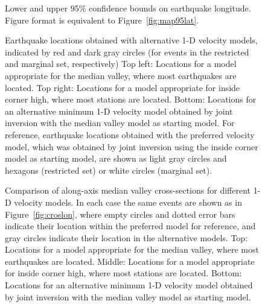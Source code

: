 \documentclass[jgrga]{agu2001} %
\renewcommand{\includefig}[2]{}
\newlength{\tw}
\begin{document}
\begin{figure}

\includefig{seismag-map-95/seismag-map-95-2}{0.65\tw} %

\includefig{seismag-map-95/seismag-map-95-3}{0.65\tw} %

\caption{Lower and upper 95\% confidence bounds on earthquake
longitude.  Figure format is equivalent to Figure~\ref{fig:map95lat}. }
\label{fig:map95lon}
\end{figure}

\begin{figure}

\setlength{\figarrwidth}{0.5\tw}

\includefig{seismag-map-var/seismag-map-jhd-mva-obh10}{20pc} \includefig{seismag-map-var/seismag-map-jhd-pro109kmvel}{20pc} %

\includefig{seismag-map-var/seismag-map-inv-mva-obh10}{20pc} %

\caption{Earthquake locations obtained with alternative 1-D velocity
models, indicated by  red and dark gray circles (for events in the
restricted and marginal set, respectively)
Top left: Locations for a model appropriate for the median valley, where most
earthquakes are located. 
Top right: Locations for a model appropriate for inside corner high, where most
stations are located. 
Bottom: Locations for an alternative minimum 1-D velocity model
obtained by joint inversion with the median valley model as starting
model.
  For reference, earthquake locations obtained with the
preferred velocity model, which was obtained by joint inversion using
the inside corner model as starting model, are shown as 
 light gray circles and hexagons  (restricted set) or white circles
(marginal set). }
\label{fig:mapvar}
\end{figure}


\begin{figure}

\includefig{cros/cros-ns-jhd-mva-obh10}{30pc} %

\includefig{cros/cros-ns-jhd-pro109kmvel}{30pc} %

\includefig{cros/cros-ns-inv-mva-obh10}{30pc} %

\caption{Comparison of along-axis median valley cross-sections for different 1-D velocity
models.  In each case the same events are shown as in
Figure~\ref{fig:croslon}, where empty circles and dotted error bars
indicate their location within the preferred model for reference, and
gray circles indicate their location in the alternative models.
Top: Locations for a model appropriate for the median valley, where most
earthquakes are located. 
Middle: Locations for a model appropriate for inside corner high, where most
stations are located. 
Bottom: Locations for an alternative minimum 1-D velocity model
obtained by joint inversion with the median valley model as starting
model.}
\label{fig:croslonvar}
\end{figure}
\end{document}
